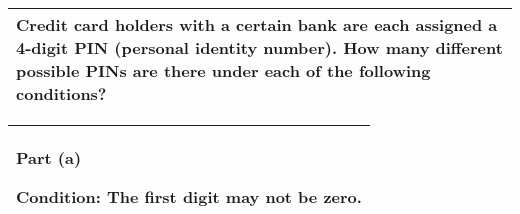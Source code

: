 \documentclass[a4paper,12pt]{article}
\begin{document}
\begin{table}[ht!]

 \centering

 \begin{tabular}{|p{15cm}|}

 \hline
\noindent Credit card holders with a certain bank are each assigned a 4-digit PIN (personal identity number). How many different possible PINs are there under each of the following conditions?
\\ \hline

  \end{tabular}

\end{table}




\begin{table}[ht!]

 \centering

 \begin{tabular}{|p{15cm}|}

 \hline

\noindent \textbf{Part (a)}

Condition: The first digit may not be zero.
\\ \hline

  \end{tabular}

\end{table}
\end{document}
